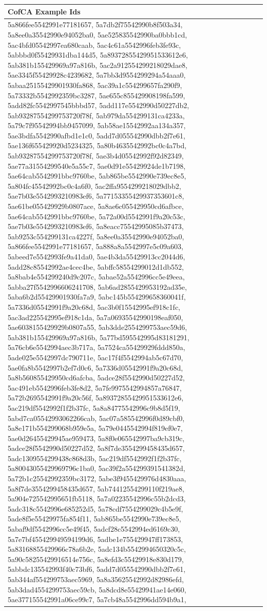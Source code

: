 \documentclass{article} %
\begin{document}
\begin{table}[h!]
    \centering
    \small %
    \begin{tabular}{|p{12cm}|} %
        \hline
        \textbf{CofCA Example Ids} \\
        \hline 
\tiny5a866fee5542991e77181657, 5a7db2f75542990b8f503a34, 5a8ee0a35542990e94052ba0, 5ae525835542990ba0bbb1cd, 5ac4bfd05542997ea680caab, 5ac4c61a5542996feb3fe93c, 5abbbd0f55429931dba144d5, 5a89372855429951533612e6, 5ab381b155429969a97a816b, 5ac2a912554299218029dae8, 5ae3345f55429928c4239682, 5a7bb3d9554299294a54aaa0, 5abaa25155429901930fa868, 5ac39a1c554299657fa290f9, 5a73332b5542992359bc3287, 5ae655c855429908198fa599, 5add82fc5542997545bbbd57, 5add117e5542990d50227db2, 5ab93287554299753720f78f, 5ab979da554299131ca4233a, 5a79c7f95542994bb9457099, 5ab58ae15542992aa134a357, 5ae3bdfa5542990afbd1e1c0, 5add7d055542990dbb2f7e61, 5ae136f655429920d5234325, 5a80b4635542992bc0c4a7bd, 5ab93287554299753720f78f, 5ae3b4d05542992f92d82349, 5ae77a31554299540e5a55c7, 5ae0d91e55429924de1b7198, 5ae64cab5542991bbc9760be, 5ab865be5542990e739ec8e5, 5a804fc45542992bc0c4a6f0, 5ac2ffa9554299218029dbb2, 5ae7b03e5542993210983ef6, 5a77153355429937353601c8, 5ae61be055429929b0807ace, 5a8ae6c055429950cd6afbce, 5ae64cab5542991bbc9760be, 5a72a00d5542991f9a20c53c, 5ae7b03e5542993210983ef6, 5a8eacc75542995085b37473, 5ab9253c554299131ca4227f, 5a8ee0a35542990e94052ba0, 5a866fee5542991e77181657, 5a888a8a5542997e5c09a603, 5abeed7e5542993fe9a41da0, 5ae4b3da55429913cc2044d6, 5add28c85542992ae4cec4be, 5abffc58554299012d1db552, 5a8bab4e554299240d9c207c, 5abae52a5542996cc5e49eea, 5abba27f5542996606241708, 5ab6ad2855429953192ad35e, 5aba6b2d55429901930fa7a9, 5abc145b554299658360041f, 5a7336d05542991f9a20c68d, 5ac3b0f15542995ef918c1fc, 5ac3ad225542995ef918c1da, 5a7a06935542990198eaf050, 5ae6038155429929b0807a55, 5ab3dde2554299753aec59d6, 5ab381b155429969a97a816b, 5a77bd595542995d83181291, 5a76cb6e5542994aec3b717a, 5a7524ca55429929fddd850a, 5ade025e5542997dc790711e, 5ac17f4f5542994ab5c67d70, 5ae0fa8b5542997b2ef7d0c6, 5a7336d05542991f9a20c68d, 5a8b560855429950cd6afcba, 5adce28f5542990d50227d52, 5ac491eb5542996feb3fe8d2, 5a7fe9975542994857a76847, 5a72b2695542991f9a20c56f, 5a89372855429951533612e6, 5ac219df5542992f1f2b37fc, 5a8a84775542996c9b8d5f19, 5abd7ca05542993062266cab, 5ac07a585542996f0d89cbf0, 5a8e171b554299068b959e5a, 5a79e0445542994f819ef0e7, 5ae0d26455429945ae959473, 5a8f0e065542997ba9cb319c, 5adce28f5542990d50227d52, 5a8f7de3554299458435d657, 5adc1309554299438c868d3b, 5ac219df5542992f1f2b37fc, 5a80043055429969796c1ba0, 5ac39f2a554299391541382d, 5a72b1c25542992359bc3172, 5abe3f9455429976d4830aaa, 5a8f7de3554299458435d657, 5ab74412554299110f219ae8, 5a904e725542995651fb5118, 5a7a02235542996c55b2dcd3, 5adc318c5542996e685252d5, 5a78cdf7554299029c4b5e9f, 5ade8f5e55429975fa854f11, 5ab865be5542990e739ec8e5, 5abaf9df5542996cc5e49f45, 5adcf28c5542994ed6169c30, 5a7e7bf455429949594199d6, 5adbe1e755429947ff173853, 5a83168855429966c78a6b2e, 5adc134b5542994650320c5c, 5a90c58255429916514e756c, 5a8efd3c55429918e830d179, 5abbdc135542993f40c73bf6, 5add7d055542990dbb2f7e61, 5ab344af554299753aec5969, 5a8a35625542992d82986efd, 5ab3dad4554299753aec59cb, 5a8dcd8e55429941ae14e060, 5ae377155542991a06ce99c7, 5a7cb48a5542996dd594b9a1, 
\end{tabular}
\end{table}
\end{document}
